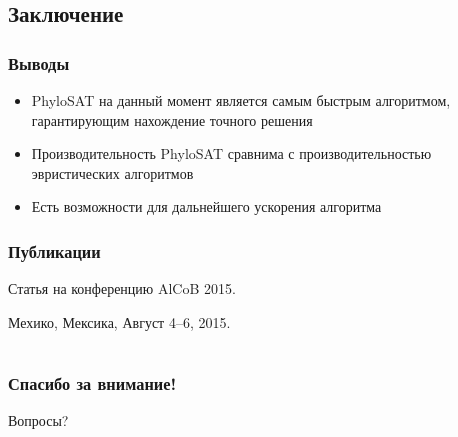 \documentclass[hyperref={unicode}]{beamer}
\begin{document}
\subsection{Заключение}

\begin{frame}
\frametitle{Выводы}

\begin{itemize}
	\item PhyloSAT на данный момент является самым быстрым алгоритмом, гарантирующим нахождение точного решения
	\item Производительность PhyloSAT сравнима с производительностью эвристических алгоритмов
	\item Есть возможности для дальнейшего ускорения алгоритма
\end{itemize}

\end{frame}

\begin{frame}
\frametitle{Публикации}

Статья на конференцию AlCoB 2015.

Мехико, Мексика, Август 4--6, 2015.

\end{frame}

\section{}

\begin{frame}
\frametitle{Спасибо за внимание!}

Вопросы?
\end{frame}
\end{document}
